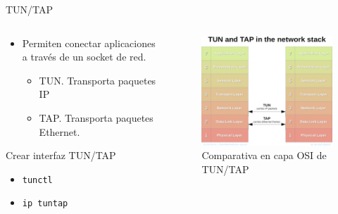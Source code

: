 \documentclass[aspectratio=169,xcolor=dvipsnames]{beamer}
\begin{document}
	\begin{frame}{TUN/TAP}
	    \begin{columns}
	        \begin{column}{0.5\textwidth}
	            \begin{itemize}
	                \item Permiten conectar aplicaciones a través de un socket de red.
	                \begin{itemize}
	                    \item TUN. Transporta paquetes IP
	                    \item TAP. Transporta paquetes Ethernet.
	                \end{itemize}
	            \end{itemize}
	            
	            \begin{exampleblock}{Crear interfaz TUN/TAP}
	                \begin{itemize}
	                    \item \texttt{tunctl}
	                    \item \texttt{ip tuntap}
	                \end{itemize}
	            \end{exampleblock}
	        \end{column}
	        
	        \begin{column}{0.5\textwidth}
	                \begin{figure}[h]
                        \includegraphics[width=1\textwidth]{img/tun_vs_tap.png}
                        \caption{Comparativa en capa OSI de TUN/TAP}
                    \end{figure}
	        \end{column}
	    \end{columns}
	\end{frame}
	
\end{document}
